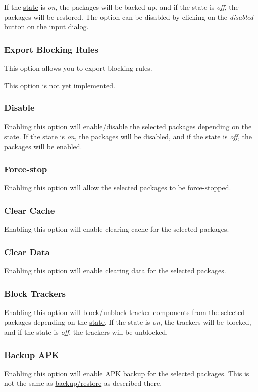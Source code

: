 If the \hyperref[subsubsec:profile-state]{state} is \textit{on}, the packages will be backed up, and if the state is
\textit{off}, the packages will be restored. The option can be disabled by clicking on the \textit{disabled} button on
the input dialog.

\subsubsection{Export Blocking Rules}
This option allows you to export blocking rules.

\begin{danger}[Danger]
    This option is not yet implemented.
\end{danger}

\subsubsection{Disable}
Enabling this option will enable/disable the selected packages depending on the \hyperref[subsubsec:profile-state]{state}.
If the state is \textit{on}, the packages will be disabled, and if the state is \textit{off}, the packages will be enabled.

\subsubsection{Force-stop}
Enabling this option will allow the selected packages to be force-stopped.

\subsubsection{Clear Cache}
Enabling this option will enable clearing cache for the selected packages.

\subsubsection{Clear Data}
Enabling this option will enable clearing data for the selected packages.

\subsubsection{Block Trackers}
Enabling this option will block/unblock tracker components from the selected packages depending on the
\hyperref[subsubsec:profile-state]{state}. If the state is \textit{on}, the trackers will be blocked, and if the state
is \textit{off}, the trackers will be unblocked.

\subsubsection{Backup APK}
Enabling this option will enable APK backup for the selected packages. This is not the same as
\hyperref[sec:backup-restore]{backup/restore} as described there.
